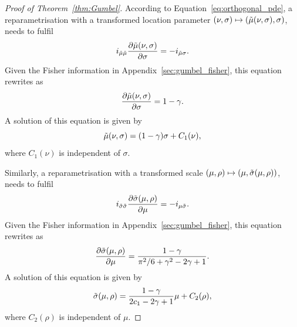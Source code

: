 \documentclass[10pt,a4paper]{amsart}
\begin{document}
\begin{proof}[Proof of Theorem~\ref{thm:Gumbel}]
According to Equation~\eqref{eq:orthogonal_pde}, a reparametrisation with a transformed location parameter $(\nu,\sigma) \mapsto (\Tilde{\mu}(\nu,\sigma),\sigma)$, needs to fulfil
\begin{equation*}
    i_{\Tilde{\mu}\Tilde{\mu}} \frac{\partial \Tilde{\mu}(\nu,\sigma)}{\partial \sigma}= - i_{\Tilde{\mu}\sigma}.
\end{equation*}
Given the Fisher information in Appendix~\ref{sec:gumbel_fisher}, this equation rewrites as
\begin{equation*}
    \frac{\partial \Tilde{\mu}(\nu,\sigma)}{\partial \sigma} = 1- \gamma.
\end{equation*}
A solution of this equation is given by
\begin{equation*}
\Tilde{\mu}(\nu,\sigma) = (1- \gamma)\sigma + C_1(\nu),
\end{equation*}
where $C_1(\nu)$ is independent of $\sigma$.


Similarly, a reparametrisation with a transformed scale  $(\mu,\rho) \mapsto (\mu,\Tilde{\sigma}(\mu,\rho))$, needs to fulfil
\begin{equation*}
    i_{\Tilde{\sigma}\Tilde{\sigma}} \frac{\partial \Tilde{\sigma}(\mu,\rho)}{\partial \mu}= - i_{\mu\Tilde{\sigma}}.
\end{equation*}
Given the Fisher information in Appendix~\ref{sec:gumbel_fisher}, this equation rewrites as
\begin{equation*}
    \frac{\partial \Tilde{\sigma}(\mu,\rho)}{\partial \mu} = \frac{1- \gamma}{\pi^2/6+\gamma^2 - 2 \gamma +1}.
\end{equation*}
A solution of this equation is given by
\begin{equation*}
\Tilde{\sigma}(\mu,\rho) = \frac{1- \gamma}{2c_1 -2\gamma+1}\mu + C_2(\rho),
\end{equation*}
where $C_2(\rho)$ is independent of $\mu$.
\end{proof}
\end{document}
